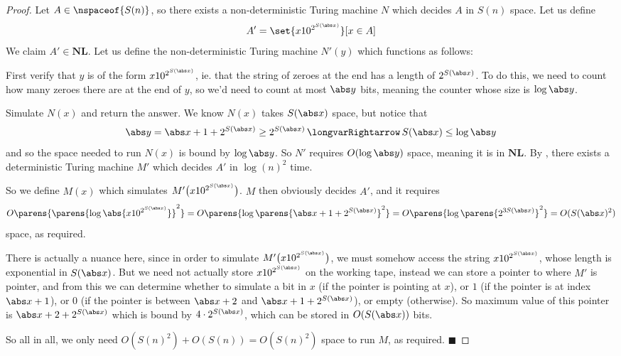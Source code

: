 \documentclass[10pt]{article}
\def\implies{\,\longvarRightarrow\,}
\def\NL{\mathbf{NL}}
\def\qed{%
    \ifmmode%
        \eqno\blacksquare%
    \else%
        \hskip1cm\allowbreak\hbox{}\nobreak\hfill$\blacksquare$%
    \fi%
}
\begin{document}
\begin{proof}

    Let $A\in\nspaceof{S(n)}$, so there exists a non-deterministic Turing machine $N$ which decides $A$ in $S(n)$ space.
    Let us define
    \[ A' = \set{x10^{2^{S(\abs x)}}}[x\in A] \]
    We claim $A'\in\NL$.
    Let us define the non-deterministic Turing machine $N'(y)$ which functions as follows:
    \benum
        \item First verify that $y$ is of the form $x10^{2^{S(\abs x)}}$, ie. that the string of zeroes at the end has a length of $2^{S(\abs x)}$.
        To do this, we need to count how many zeroes there are at the end of $y$, so we'd need to count at most $\abs y$ bits, meaning the counter whose size is $\log\abs y$.
        \item Simulate $N(x)$ and return the answer.
    \eenum
    We know $N(x)$ takes $S(\abs x)$ space, but notice that
    \[ \abs y = \abs x+1+2^{S(\abs x)} \geq 2^{S(\abs x)} \implies S(\abs x)\leq \log\abs y \]
    and so the space needed to run $N(x)$ is bound by $\log\abs y$.
    So $N'$ requires $O(\log\abs y)$ space, meaning it is in $\NL$.
    By , there exists a deterministic Turing machine $M'$ which decides $A'$ in $\log(n)^2$ time.

    So we define $M(x)$ which simulates $M'\bigl(x10^{2^{S(\abs x)}}\bigr)$.
    $M$ then obviously decides $A'$, and it requires
    \[ O\parens{\parens{\log\abs{x10^{2^{S(\abs x)}}}}^2} = O\parens{\log\parens{\abs x+1+2^{S(\abs x)}}^2} = O\parens{\log\parens{2^{3S(\abs x)}}^2} = O(S(\abs x)^2) \]
    space, as required.

    There is actually a nuance here, since in order to simulate $M'\bigl(x10^{2^{S(\abs x)}}\bigr)$, we must somehow access the string $x10^{2^{S(\abs x)}}$, whose length is exponential in $S(\abs x)$.
    But we need not actually store $x10^{2^{S(\abs x)}}$ on the working tape, instead we can store a pointer to where $M'$ is pointer, and from this we can determine whether to simulate a bit in $x$ (if
    the pointer is pointing at $x$), or $1$ (if the pointer is at index $\abs x+1$), or $0$ (if the pointer is between $\abs x+2$ and $\abs x+1+2^{S(\abs x)}$), or empty (otherwise).
    So maximum value of this pointer is $\abs x+2+2^{S(\abs x)}$ which is bound by $4\cdot2^{S(\abs x)}$, which can be stored in $O(S(\abs x))$ bits.

    So all in all, we only need $O(S(n)^2)+O(S(n))=O(S(n)^2)$ space to run $M$, as required.
    \qed

\end{proof}
\end{document}
